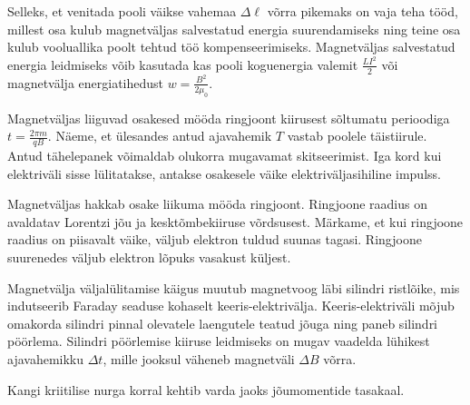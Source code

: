 \documentclass[10pt, twoside]{article}
\begin{document}
{%

\hint
Selleks, et venitada pooli väikse vahemaa $\Delta \ell$ võrra pikemaks on vaja teha tööd, millest osa kulub magnetväljas salvestatud energia suurendamiseks ning teine osa kulub vooluallika poolt tehtud töö kompenseerimiseks. Magnetväljas salvestatud energia leidmiseks võib kasutada kas pooli koguenergia valemit $\frac{LI^2}{2}$ või magnetvälja energiatihedust $w = \frac{B^2}{2\mu_0}$.
\probend
\bigskip


\hint
Magnetväljas liiguvad osakesed mööda ringjoont kiirusest sõltumatu perioodiga $t = \frac{2\pi m}{qB}$. Näeme, et ülesandes antud ajavahemik $T$ vastab poolele täistiirule. Antud tähelepanek võimaldab olukorra mugavamat skitseerimist. Iga kord kui elektriväli sisse lülitatakse, antakse osakesele väike elektriväljasihiline impulss.
\probend
\bigskip


\hint
Magnetväljas hakkab osake liikuma mööda ringjoont. Ringjoone raadius on avaldatav Lorentzi jõu ja kesktõmbekiiruse võrdsusest.
Märkame, et kui ringjoone raadius on piisavalt väike, väljub elektron tuldud suunas tagasi. Ringjoone suurenedes väljub elektron lõpuks vasakust küljest.
\probend
\bigskip


\hint
Magnetvälja väljalülitamise käigus muutub magnetvoog läbi silindri ristlõike, mis indutseerib Faraday seaduse kohaselt keeris-elektrivälja. Keeris-elektriväli mõjub omakorda silindri pinnal olevatele laengutele teatud jõuga ning paneb silindri pöörlema. Silindri pöörlemise kiiruse leidmiseks on mugav vaadelda lühikest ajavahemikku $\Delta t$, mille jooksul väheneb magnetväli $\Delta B$ võrra.
\probend
\bigskip


\hint
Kangi kriitilise nurga korral kehtib varda jaoks jõumomentide tasakaal.
\probend
\bigskip

}
\end{document}
